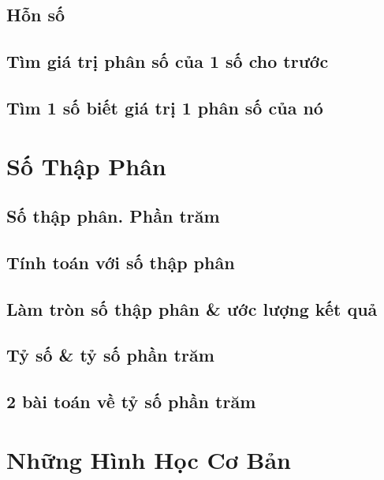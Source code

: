 \documentclass{article}
\numberwithin{equation}{section}
\begin{document}
\subsection{Hỗn số}

\subsection{Tìm giá trị phân số của 1 số cho trước}

\subsection{Tìm 1 số biết giá trị 1 phân số của nó}


\section{Số Thập Phân}

\subsection{Số thập phân. Phần trăm}

\subsection{Tính toán với số thập phân}

\subsection{Làm tròn số thập phân \& ước lượng kết quả}

\subsection{Tỷ số \& tỷ số phần trăm}

\subsection{2 bài toán về tỷ số phần trăm}


\newpage
\section{Những Hình Học Cơ Bản}
\end{document}
